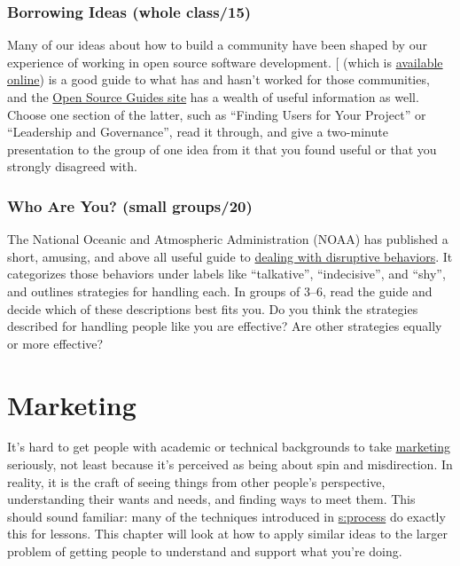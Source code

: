 \subsection{Borrowing Ideas (whole class/15)}\label{borrowing-ideas-whole-class15}

Many of our ideas about how to build a community have been shaped by
our experience of working in open source software development.
{[}\protect[\hyperlink{b:Foge2005}{Foge2005}]{]} (which is \href{http://producingoss.com/}{available online}) is a
good guide to what has and hasn't worked for those communities, and
the \href{https://opensource.guide/}{Open Source Guides site} has a wealth of
useful information as well. Choose one section of the latter, such as
``Finding Users for Your Project'' or ``Leadership and Governance'', read
it through, and give a two-minute presentation to the group of one
idea from it that you found useful or that you strongly disagreed
with.

\subsection{Who Are You? (small groups/20)}\label{who-are-you-small-groups20}

The National Oceanic and Atmospheric Administration (NOAA) has
published a short, amusing, and above all useful guide to \href{https://coast.noaa.gov/ddb/story_html5.html}{dealing
with disruptive behaviors}. It categorizes those
behaviors under labels like ``talkative'', ``indecisive'', and ``shy'', and
outlines strategies for handling each. In groups of 3--6, read the
guide and decide which of these descriptions best fits you. Do you
think the strategies described for handling people like you are
effective? Are other strategies equally or more effective?

\chapter{Marketing}\label{s:marketing}

It's hard to get people with academic or technical backgrounds to take
\protect\hyperlink{g:marketing}{marketing} seriously, not least because it's perceived
as being about spin and misdirection. In reality, it is the craft of
seeing things from other people's perspective, understanding their
wants and needs, and finding ways to meet them. This should sound
familiar: many of the techniques introduced in \protect\hyperlink{CHAPTER}{s:process}
do exactly this for lessons. This chapter will look at how to apply
similar ideas to the larger problem of getting people to understand
and support what you're doing.

